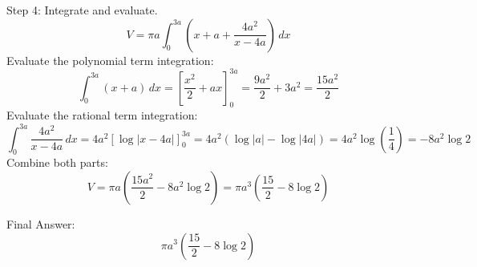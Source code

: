 \documentclass[11pt, a4paper]{article}
\begin{document}
Step 4: Integrate and evaluate.
\[
V = \pi a \int_{0}^{3a} \left( x + a + \frac{4a^2}{x - 4a} \right) \, dx
\]
Evaluate the polynomial term integration:
\[
\int_{0}^{3a} (x + a) \, dx = \left[ \frac{x^2}{2} + ax \right]_{0}^{3a} = \frac{9a^2}{2} + 3a^2 = \frac{15a^2}{2}
\]
Evaluate the rational term integration:
\[
\int_{0}^{3a} \frac{4a^2}{x-4a} \, dx = 4a^2 \left[ \log |x - 4a| \right]_{0}^{3a} = 4a^2 \left( \log|a| - \log|4a| \right) = 4a^2 \log\left(\frac{1}{4}\right) = -8a^2 \log 2
\]
Combine both parts:
\[
V = \pi a \left( \frac{15a^2}{2} - 8a^2 \log 2 \right) = \pi a^3 \left( \frac{15}{2} - 8\log 2 \right)
\]

Final Answer:
\[
\boxed{\pi a^3 \left( \frac{15}{2} - 8\log 2 \right)}
\]

\end{document}
